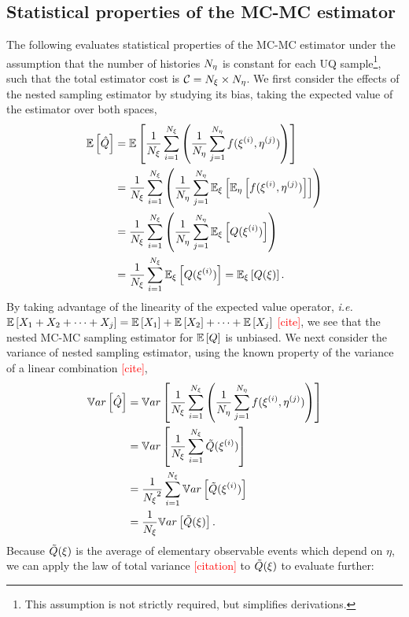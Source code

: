 \subsection{Statistical properties of the MC-MC estimator}
The following evaluates statistical properties of the MC-MC estimator under the assumption that the number of histories ${N_\eta}$ is constant for each UQ sample\footnote{This assumption is not strictly required, but simplifies derivations.}, such that the total estimator cost is $\mathcal{C} = {N_\xi} \times {N_\eta}$. We first consider the effects of the nested sampling estimator by studying its bias, taking the expected value of the estimator over both spaces,
\begin{equation}\label{eq:EE-qhat}
    \begin{split}
        \mathbb{E}\left[\hat{Q}\right] &= \mathbb{E}\left[\frac{1}{{N_\xi}} \sum_{i=1}^{{N_\xi}} \left(\frac{1}{{N_\eta}}\sum_{j=1}^{N_\eta} f(\xi^{(i)},\eta^{(j)}) \right)\right] \\
        &= \frac{1}{{N_\xi}} \sum_{i=1}^{{N_\xi}} \left(\frac{1}{{N_\eta}} \sum_{j=1}^{N_\eta} \mathbb{E}_\xi\left[\mathbb{E}_\eta\left[f(\xi^{(i)},\eta^{(j)})\right]\right] \right) \\
        &= \frac{1}{{N_\xi}} \sum_{i=1}^{{N_\xi}} \left( \frac{1}{{N_\eta}} \sum_{j=1}^{N_\eta} \mathbb{E}_\xi\left[Q(\xi^{(i)})\right] \right) \\
        &= \frac{1}{{N_\xi}} \sum_{i=1}^{{N_\xi}} \mathbb{E}_\xi\left[Q(\xi^{(i)})\right] = \mathbb{E}_\xi\left[Q(\xi)\right] .
    \end{split}
\end{equation}
By taking advantage of the linearity of the expected value operator, \textit{i.e.} $\mathbb{E}\left[X_1 + X_2 + \cdots + X_j\right] = \mathbb{E}\left[X_1\right] + \mathbb{E}\left[X_2\right] + \cdots + \mathbb{E}\left[X_j\right]$ \textcolor{red}{[cite]}, we see that the nested MC-MC sampling estimator for $\mathbb{E}\left[Q\right]$ is unbiased. We next consider the variance of nested sampling estimator, using the known property of the variance of a linear combination \textcolor{red}{[cite]},
\begin{equation}\label{eq:Var-qhat}
    \begin{split}
        \mathbb{V}ar\left[\hat{Q}\right] &= \mathbb{V}ar\left[\frac{1}{{N_\xi}} \sum_{i=1}^{{N_\xi}} \left( \frac{1}{{N_\eta}} \sum_{j=1}^{N_\eta} f(\xi^{(i)},\eta^{(j)}) \right)\right] \\
        &= \mathbb{V}ar\left[\frac{1}{{N_\xi}} \sum_{i=1}^{{N_\xi}} \tilde{Q}(\xi^{(i)})\right] \\
        &= \frac{1}{{N_\xi}^2} \sum_{i=1}^{{N_\xi}} \mathbb{V}ar\left[\tilde{Q}(\xi^{(i)})\right] \\
        &= \frac{1}{{N_\xi}} \mathbb{V}ar\left[\tilde{Q}(\xi)\right] .
    \end{split}
\end{equation}
Because $\tilde{Q}(\xi)$ is the average of elementary observable events which depend on $\eta$, we can apply the law of total variance \textcolor{red}{[citation]} to $\tilde{Q}(\xi)$ to evaluate further:
